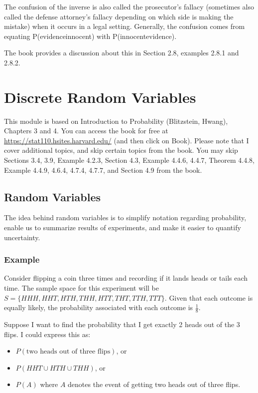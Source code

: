 \documentclass[
]{book}
\providecommand{\tightlist}{%
  \setlength{\itemsep}{0pt}\setlength{\parskip}{0pt}}
\begin{document}
The confusion of the inverse is also called the prosecutor's fallacy (sometimes also called the defense attorney's fallacy depending on which side is making the mistake) when it occurs in a legal setting. Generally, the confusion comes from equating P(evidence\textbar innocent) with P(innocent\textbar evidence).

The book provides a discussion about this in Section 2.8, examples 2.8.1 and 2.8.2.

\chapter{Discrete Random Variables}\label{discrete-random-variables}

This module is based on Introduction to Probability (Blitzstein, Hwang), Chapters 3 and 4. You can access the book for free at \url{https://stat110.hsites.harvard.edu/} (and then click on Book). Please note that I cover additional topics, and skip certain topics from the book. You may skip Sections 3.4, 3.9, Example 4.2.3, Section 4.3, Example 4.4.6, 4.4.7, Theorem 4.4.8, Example 4.4.9, 4.6.4, 4.7.4, 4.7.7, and Section 4.9 from the book.

\section{Random Variables}\label{random-variables}

The idea behind random variables is to simplify notation regarding probability, enable us to summarize results of experiments, and make it easier to quantify uncertainty.

\subsection{Example}\label{example}

Consider flipping a coin three times and recording if it lands heads or tails each time. The sample space for this experiment will be \(S = \{HHH, HHT, HTH, THH, HTT, THT, TTH, TTT\}\). Given that each outcome is equally likely, the probability associated with each outcome is \(\frac{1}{8}\).

Suppose I want to find the probability that I get exactly 2 heads out of the 3 flips. I could express this as:

\begin{itemize}
\tightlist
\item
  \(P(\text{two heads out of three flips})\), or
\item
  \(P(HHT \cup HTH \cup THH)\), or
\item
  \(P(A)\) where \(A\) denotes the event of getting two heads out of three flips.
\end{itemize}
\end{document}
